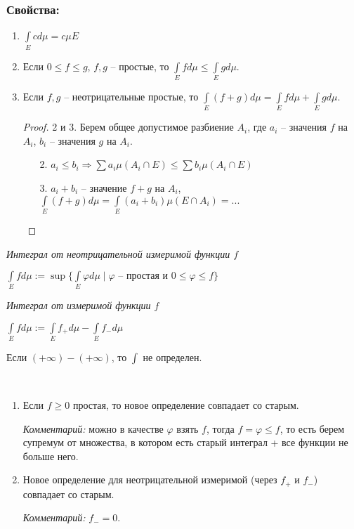\subsubsection*{Свойства:}

\begin{enumerate}
    \item $\int\limits_E c d\mu = c\mu E$
    
    \item Если $0\leq f \leq g$, $f, g$ – простые, то $\int\limits_E f d\mu\leq  \int\limits_E g d\mu$.
    
    \item Если $f, g$ – неотрицательные простые, то $\int\limits_E (f+g) d\mu= \int\limits_Ef d\mu+\int\limits_E g d\mu$.
    
    \begin{proof}
        2 и 3. Берем общее допустимое разбиение $A_i$, где $a_i$ – значения $f$ на $A_i$,
        $b_i$ – значения $g$ на $A_i$.

        \begin{enumerate}
            \item[2.] $a_i\leq b_i\Rightarrow \sum a_i\mu (A_i \cap E)\leq \sum b_i\mu (A_i \cap E)$
            \item[3.] $a_i + b_i$ – значение $f+g$ на $A_i$, $\int\limits_E (f+g) d\mu = \int\limits_E (a_i+b_i) \mu (E\cap A_i)=...$
        \end{enumerate}
    \end{proof}
\end{enumerate}

\begin{definition}
    \textit{Интеграл от неотрицательной измеримой функции $f$}

    $\int\limits_E f d\mu := \sup\{ \int\limits_E \varphi d\mu \mid \varphi \text{ – простая и }
    0\leq \varphi \leq f\}$
\end{definition}

\begin{definition}
    \textit{Интеграл от измеримой функции $f$}

    $\int\limits_E f d\mu := \int\limits_E f_+ d\mu - \int\limits_E f_- d\mu$

    Если $(+\infty)-(+\infty)$, то $\int$ не определен.
\end{definition}

\begin{remark}~
    \begin{enumerate}
        \item Если $f\geq 0$ простая, то новое определение совпадает со старым.
        
        \textit{Комментарий:} можно в качестве $\varphi$ взять $f$, тогда $f=\varphi \leq f$, то есть 
        берем супремум от множества, в котором есть старый интеграл + все функции не больше него.

        \item Новое определение для неотрицательной измеримой (через $f_+$ и $f_-$) совпадает со старым.
        
        \textit{Комментарий:} $f_-=0$.
    \end{enumerate}
\end{remark}

